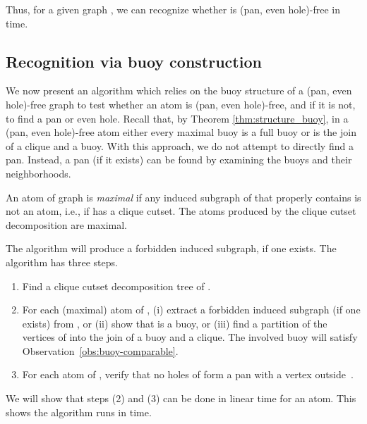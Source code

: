 \documentclass[11pt,a4paper]{article}
\begin{document}
Thus, for a given graph , we can recognize whether  is
(pan, even hole)-free in  time.



\subsection{Recognition via buoy construction}

We now present an algorithm which relies on the buoy structure of
a (pan, even hole)-free graph to test whether an atom is (pan,
even hole)-free, and if it is not, to find a pan or even hole.
Recall that, by Theorem \ref{thm:structure_buoy}, in a (pan, even
hole)-free atom  either every maximal buoy is a full buoy or
 is the join of a clique and a buoy. With this approach, we do
not attempt to directly find a pan. Instead, a pan (if it exists)
can be found by examining the buoys and their neighborhoods.

An atom  of graph  is {\it maximal} if any induced subgraph
 of  that properly contains  is not an atom, i.e., if 
has a clique cutset. The atoms produced by the clique cutset
decomposition are maximal.

The algorithm will produce a forbidden induced subgraph, if one
exists. The algorithm has three steps.
\begin{enumerate}[(1)]
 \item Find a clique cutset decomposition tree  of .
 \item For each (maximal) atom  of ,  (i) extract a forbidden induced
subgraph (if one exists) from , or (ii) show that  is a buoy, or (iii)  find a partition of
the vertices of  into the
join of a buoy and a clique. The involved buoy will
satisfy Observation~\ref{obs:buoy-comparable}.
 \item For each atom  of , verify that no holes of 
    form a pan with a vertex outside~.
\end{enumerate}
We will show that steps (2) and (3) can be done in linear time for an
atom. This shows the algorithm runs in  time.
\end{document}
